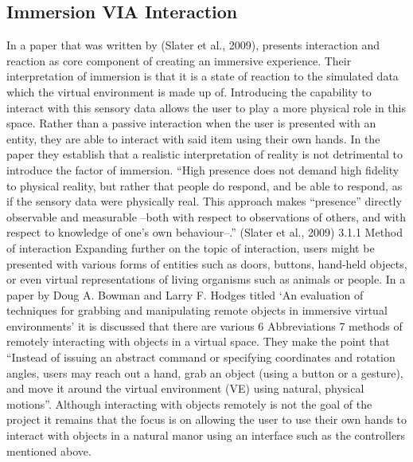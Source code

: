 \subsection{Immersion VIA Interaction}
In a paper that was written by (Slater et al., 2009), presents interaction and reaction as core component of creating an immersive experience. Their interpretation of immersion is that it is a state of reaction to the simulated data which the virtual environment is made up of. Introducing the capability to interact with this sensory data allows the user to play a more physical role in this space. Rather than a passive interaction when the user is presented with an entity, they are able to interact with said item using their own hands. In the paper they establish that a realistic interpretation of reality is not detrimental to introduce the factor of immersion. “High presence does not demand high fidelity to physical reality, but rather that people do respond, and be able to respond, as if the sensory data were physically real. This approach makes “presence” directly observable and measurable –both with respect to observations of others, and with respect to knowledge of one’s own behaviour–.” (Slater et al., 2009) 3.1.1 Method of interaction Expanding further on the topic of interaction, users might be presented with various forms of entities such as doors, buttons, hand-held objects, or even virtual representations of living organisms such as animals or people. In a paper by Doug A. Bowman and Larry F. Hodges titled ‘An evaluation of techniques for grabbing and manipulating remote objects in immersive virtual environments’ it is discussed that there are various 6 Abbreviations 7 methods of remotely interacting with objects in a virtual space. They make the point that “Instead of issuing an abstract command or specifying coordinates and rotation angles, users may reach out a hand, grab an object (using a button or a gesture), and move it around the virtual environment (VE) using natural, physical motions”. Although interacting with objects remotely is not the goal of the project it remains that the focus is on allowing the user to use their own hands to interact with objects in a natural manor using an interface such as the controllers mentioned above.  

